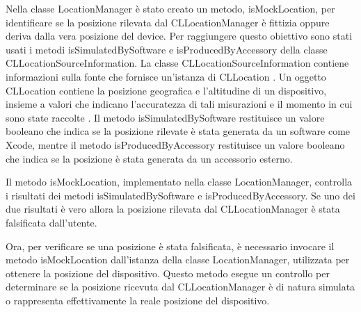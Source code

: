 Nella classe LocationManager è stato creato un metodo, isMockLocation, per identificare se la posizione rilevata dal CLLocationManager è fittizia oppure deriva dalla vera posizione del device. Per raggiungere questo obiettivo sono stati usati i metodi isSimulatedBySoftware e isProducedByAccessory della classe CLLocationSourceInformation. La classe CLLocationSourceInformation contiene informazioni sulla fonte che fornisce un'istanza di CLLocation \cite{CLLocationSourceInformation}. Un oggetto CLLocation contiene la posizione geografica e l'altitudine di un dispositivo, insieme a valori che indicano l'accuratezza di tali misurazioni e il momento in cui sono state raccolte \cite{CLLocation}.
Il metodo isSimulatedBySoftware restituisce un valore booleano che indica se la posizione rilevate è stata generata da un software come Xcode, mentre il metodo isProducedByAccessory restituisce un valore booleano che indica se la posizione è stata generata da un accessorio esterno.

Il metodo isMockLocation, implementato nella classe LocationManager, controlla i risultati dei metodi isSimulatedBySoftware e isProducedByAccessory. Se uno dei due risultati è vero allora la posizione rilevata dal CLLocationManager è stata falsificata dall'utente.

Ora, per verificare se una posizione è stata falsificata, è necessario invocare il metodo isMockLocation dall'istanza della classe LocationManager, utilizzata per ottenere la posizione del dispositivo. Questo metodo esegue un controllo per determinare se la posizione ricevuta dal CLLocationManager è di natura simulata o rappresenta effettivamente la reale posizione del dispositivo.